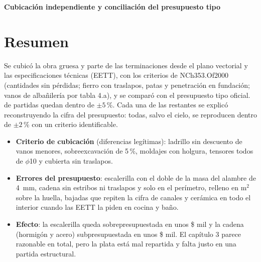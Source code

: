 \documentclass[letterpaper,10pt]{article}
\begin{document}
\begin{center}
{\LARGE\bfseries Cubicación independiente y conciliación del presupuesto tipo\par}
\vspace{2pt}{\large Sede Social Tipo C en albañilería armada, Fondo Social Presidente de la República (2023)\par}
\vspace{4pt}{\small Nicolás Albornoz Pavez \textperiodcentered\ Estudiante de Ingeniería Civil, UTFSM \textperiodcentered\ 20 de noviembre de 2026\par}
\end{center}

\section{Resumen}
Se cubicó la obra gruesa y parte de las terminaciones desde el plano vectorial y las especificaciones técnicas (EETT), con los criterios de NCh353.Of2000 (cantidades sin pérdidas; fierro con traslapos, patas y penetración en fundación; vanos de albañilería por tabla 4.a), y se comparó con el presupuesto tipo oficial. \vDentro{} de \vTotal{} partidas quedan dentro de $\pm5$\,\%. Cada una de las restantes se explicó reconstruyendo la cifra del presupuesto: todas, salvo el cielo, se reproducen dentro de $\pm2$\,\% con un criterio identificable.

\begin{resultado}
\begin{itemize}[nosep]
\item \textbf{Criterio de cubicación} (diferencias legítimas): ladrillo sin descuento de vanos menores, sobreexcavación de 5\,\%, moldajes con holgura, tensores todos de $\phi$10 y cubierta sin traslapos.
\item \textbf{Errores del presupuesto}: escalerilla con el doble de la masa del alambre de \SI{4}{mm}, cadena sin estribos ni traslapos y solo en el perímetro, relleno en m$^2$ sobre la huella, bajadas que repiten la cifra de canales y cerámica en todo el interior cuando las EETT la piden en cocina y baño.
\item \textbf{Efecto}: la escalerilla queda sobrepresupuestada en unos \$\vSob{} mil y la cadena (hormigón y acero) subpresupuestada en unos \$\vFal{} mil. El capítulo 3 parece razonable en total, pero la plata está mal repartida y falta justo en una partida estructural.
\end{itemize}
\end{resultado}
\end{document}
